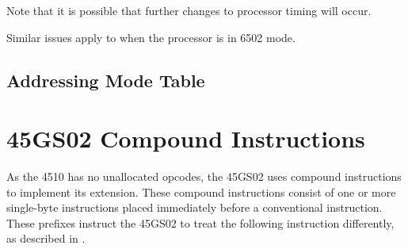 Note that it is possible that further changes to processor timing will occur.

Similar issues apply to when the processor is in 6502 mode.

\begin{center}
\end{center}

\subsection{Addressing Mode Table}

\begin{center}
\end{center}




\section{45GS02 Compound Instructions}

As the 4510 has no unallocated opcodes, the 45GS02 uses compound instructions
to implement its extension.  These compound instructions consist of one or
more single-byte instructions placed immediately before a conventional
instruction.  These prefixes instruct the 45GS02 to treat the following instruction
differently, as described in .








